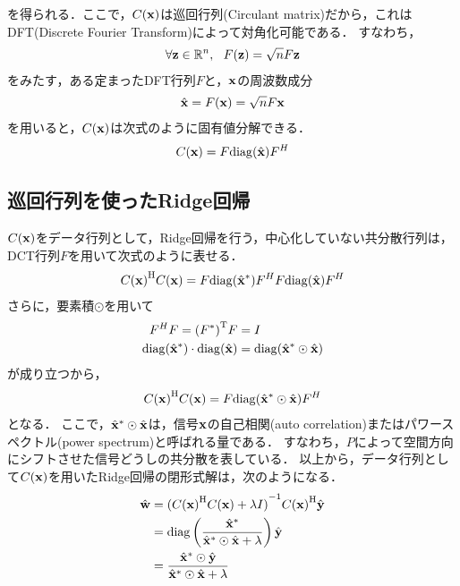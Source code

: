 \documentclass[11pt,a4j]{jarticle}
\begin{document}
      を得られる．ここで，$C({\bf x})$は巡回行列(Circulant matrix)だから，これはDFT(Discrete Fourier Transform)によって対角化可能である．
      すなわち，
      \begin{align}
        \forall {\bf z} \in \mathbb{R}^{n}, ~~ F({\bf z}) = \sqrt{n} F{\bf z}
      \end{align}
      をみたす，ある定まったDFT行列$F$と，$\bf x$の周波数成分
      \begin{align}
        \hat{\bf x} = F({\bf x}) = \sqrt{n} F{\bf x}
      \end{align}
      を用いると，$C({\bf x})$は次式のように固有値分解できる．
      \begin{align}
        C({\bf x}) = F {\rm diag} (\hat{\bf x}) {F}^{H}
      \end{align}

    \subsection{巡回行列を使ったRidge回帰}
      $C({\bf x})$をデータ行列として，Ridge回帰を行う，中心化していない共分散行列は，DCT行列$F$を用いて次式のように表せる．
      \begin{align}
        {C({\bf x})}^{\mathrm{H}}C({\bf x}) = F {\rm diag} (\hat{{\bf x}}^{*}) {F}^{H} F {\rm diag} (\hat{\bf x}) {F}^{H}
      \end{align}
      さらに，要素積$\odot$を用いて
      \begin{align}
        F^{H}F = {( F^{*} )}^{\mathrm{T}} F &= I \\
        {\rm diag} (\hat{{\bf x}}^{*})\cdot {\rm diag} (\hat{\bf x}) &= {\rm diag} ( \hat{{\bf x}}^{*} \odot \hat{\bf x} )
      \end{align}
      が成り立つから，
      \begin{align}
        {C({\bf x})}^{\mathrm{H}}C({\bf x}) = F {\rm diag} ( \hat{{\bf x}}^{*} \odot \hat{\bf x} ) {F}^{H}
      \end{align}
      となる．
      ここで，$\hat{{\bf x}}^{*} \odot \hat{\bf x}$は，信号$\bf x$の自己相関(auto correlation)またはパワースペクトル(power spectrum)と呼ばれる量である．
      すなわち，$P$によって空間方向にシフトさせた信号どうしの共分散を表している．
      以上から，データ行列として$C({\bf x})$を用いたRidge回帰の閉形式解は，次のようになる．
      \begin{align}
        \hat{\bf w} &= { ({C({\bf x})}^{\mathrm{H}} C({\bf x}) + \lambda I) }^{-1} {C({\bf x})}^{\mathrm{H}} \hat{\bf y} \\
                &= {\rm diag} \left( \frac{{\hat{\bf x}}^{*}}{\hat{{\bf x}}^{*} \odot \hat{\bf x} + \lambda} \right) \hat{\bf y} \\
                &= \frac{{\hat{\bf x}}^{*} \odot \hat{\bf y}}{\hat{{\bf x}}^{*} \odot \hat{\bf x} + \lambda} 
      \end{align}
\end{document}
